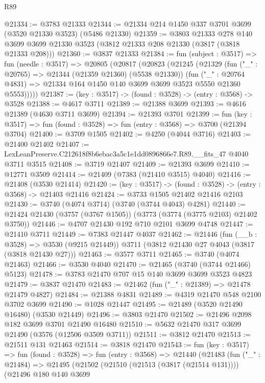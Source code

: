 \begin{lexlean}{R89}
\begin{coremodule}
@21334 := @3783 @21333
@21344 := @21334 @214 @1450 @337 @3701 @3699 (@3520 @21330 @3523) (@5486 @21330)
@21359 := @3803
    @21333
    @278
    @140
    @3699
    @3699
    @21330
    @3523
    (@3812 @21333 @208 @21330 (@3817 (@3818 @21333 @208)))
@21360 := @3837 @21333
@21384 := fun (subject : @3517) =>
  fun (needle : @3517) =>
  @20805
    (@20817
      (@20823
        (@21245
          (@21329
            (fun ("_" : @20765) => @21344 (@21359 @21360) (@5538 @21330))
            (fun ("_" : @20764 @4831) =>
            @21334 @164 @1450 @140 @3699 @3699 @3523 @5550 @21360 @5553)))))
@21387 := (key : @3517) -> (found : @3528) -> (entry : @3568) -> @3528
@21388 := @4617 @3711
@21389 := @21388 @3699
@21393 := @4616 @21389 (@4630 @3711 @3699)
@21394 := @21393 @3701
@21399 := fun (key : @3517) => fun (found : @3528) => fun (entry : @3568) => @3700 (@21394 @3704)
@21400 := @3709 @1505
@21402 := @4250 (@4044 @3716)
@21403 := @21400 @21402
@21407 := LexLeanPreserve.C212618f8b6ebac3a5c1e1dd0896866e7.R89.__fits_47 @4040 @3711 @3515
@21408 := @3719 @21407
@21409 := @21393 @3699
@21410 := @12771 @3509
@21414 := @21409 (@7383 (@21410 @3515) @4040)
@21416 := @21408 (@3530 @21414)
@21420 := (key : @3517) -> (found : @3528) -> (entry : @3568) -> @21403 @21416
@21424 := @3733 @1505 @21402 @21416 @2103
@21430 := @3740 (@4074 @3714) (@3740 (@3744 @4043) @4281)
@21440 := @21424 @21430 (@3757 (@3767 @1505)) (@3773 (@3774 (@3775 @2103) @21402 @3750))
@21446 := @4707 @21430 @192 @710 @2101 @3699 @4748
@21447 := @21410 @3711
@21449 := @7383 @21447 @4037
@21462 := @21446
    (fun (__b : @3528) => @3530 (@9215 @21449))
    @3711
    (@3812 @21430 @27 @4043 (@3817 (@3818 @21430 @27)))
@21463 := @3577 @3711
@21465 := @3740 (@4074 @21463)
@21466 := @3530 @4040
@21470 := @21465 (@3740 (@3744 @21466) @5123)
@21478 := @3783 @21470 @707 @15 @140 @3699 @3699 @3523 @4823
@21479 := @3837 @21470
@21483 := @21462 (fun ("_" : @21389) => @21478 @21479 @4827)
@21484 := @21388 @4831
@21489 := @4319 @21470 @548 @2100 @3702 @3699
@21490 := @1028 @21447
@21495 := @21489 (@3520 @21490 @16480) (@3530 @21449)
@21496 := @3803 @21470
@21502 := @21496 @2098 @182 @3699 @3701 @21490 @16480
@21510 := @5632 @21470 @317 @3699 @21490 (@3576 (@12506 @3509 @3711))
@21511 := @3812 @21470
@21513 := @21511 @131 @21463
@21514 := @3818 @21470
@21543 := fun (key : @3517) =>
  fun (found : @3528) =>
  fun (entry : @3568) =>
  @21440
    (@21483
      (fun ("_" : @21484) =>
      @21495
        (@21502
          (@21510 (@21513 (@3817 (@21514 @131))))
          (@21496
            @180
            @140
            @3699

\end{coremodule}
\end{lexlean}

